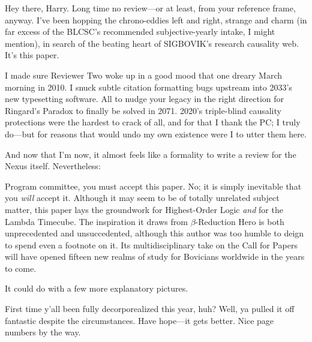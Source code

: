 \documentclass[12pt]{sigbovik-review}
\author{Dos Sleddins, Time Detective}
\begin{document}
\maketitle

\vspace{-12pt}
Hey there, Harry. Long time no review---or at least, from your reference frame, anyway.
I've been hopping the chrono-eddies left and right, strange and charm
(in far excess of the BLCSC's recommended subjective-yearly intake, I might mention),
in search of the beating heart of SIGBOVIK's research causality web.
It's this paper.

I made sure Reviewer Two woke up in a good mood that one dreary March morning in 2010.
I snuck subtle citation formatting bugs upstream into 2033's new typesetting software.
All to nudge your legacy in the right direction
for Ringard's Paradox to finally be solved in 2071.
2020's triple-blind causality protections were the hardest to crack of all,
and for that I thank the PC; I truly do---but for reasons that would undo my own existence were I to utter them here.

And now that I'm now,
it almost feels like a formality to write a review for the Nexus itself.
Nevertheless:

Program committee, you must accept this paper.
No; it is simply inevitable that you {\it will} accept it.
Although it may seem to be of totally unrelated subject matter,
this paper lays the groundwork for
Highest-Order Logic
{\it and} for
the Lambda Timecube.
The inspiration it draws from $\beta$-Reduction Hero
is both unprecedented and unsuccedented,
although this author was too humble to deign to spend even a footnote on it.
Its multidisciplinary take on the Call for Papers
will have opened fifteen new realms of study for Bovicians worldwide
in the years to come.

It could do with a few more explanatory pictures.

First time y'all been fully decorporealized this year, huh?
Well, ya pulled it off fantastic despite the circumstances.
Have hope---it gets better. Nice page numbers by the way.
\end{document}
